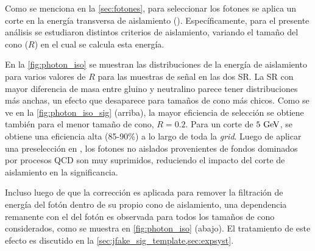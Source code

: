Como se menciona en la \cref{sec:fotones}, para seleccionar los fotones se
aplica un corte en la energía transversa de aislamiento (\etiso). Específicamente,
para el presente análisis se estudiaron distintos
criterios de aislamiento, variando el tamaño del cono ($R$) en el cual se
calcula esta energía.

En la \cref{fig:photon_iso} se muestran las distribuciones de la energía de
aislamiento para varios valores de $R$ para las muestras de señal en las dos SR.
La SR con mayor diferencia de masa entre gluino y neutralino parece tener
distribuciones más anchas, un efecto que desaparece para tamaños de cono más
chicos. Como se ve en la \cref{fig:photon_iso_sig} (arriba), la mayor eficiencia
de selección se obtiene también para el menor tamaño de cono, $R = 0.2$. Para un
corte de $5 \GeV$, se obtiene una eficiencia alta (85-90\%) a lo largo de toda la
\emph{grid}. Luego de aplicar una preselección en {\met}, los fotones no aislados
provenientes de fondos dominados por procesos QCD son muy suprimidos, reduciendo el impacto
del corte de aislamiento en la significancia.

Incluso luego de que la corrección es aplicada para remover la filtración de
energía del fotón dentro de su propio cono de aislamiento, una dependencia remanente
con el {\pt} del fotón es observada para todos los tamaños de cono
considerados, como se muestra en \cref{fig:photon_iso} (abajo). El tratamiento
de este efecto es discutido en la \cref{sec:jfake_sig_template,sec:expsyst}.


